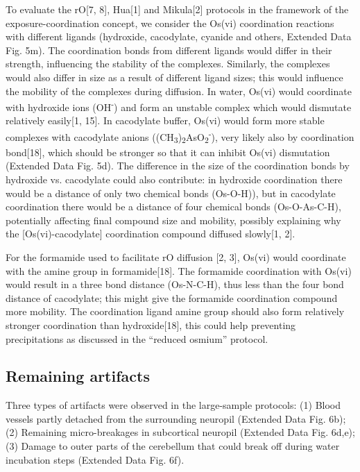 \documentclass{article}
\begin{document}
To evaluate the rO[7, 8], Hua[1] and Mikula[2] protocols in the framework of the exposure-coordination concept, we consider the Os(vi) coordination reactions with different ligands (hydroxide, cacodylate, cyanide and others, Extended Data Fig. 5m). The coordination bonds from different ligands would differ in their strength, influencing the stability of the complexes. Similarly, the complexes would also differ in size as a result of different ligand sizes; this would influence the mobility of the complexes during diffusion. In water, Os(vi) would coordinate with hydroxide ions (OH\textsuperscript{-}) and form an unstable complex which would dismutate relatively easily[1, 15]. In cacodylate buffer, Os(vi) would form more stable complexes with cacodylate anions ((CH\textsubscript{3})\textsubscript{2}AsO\textsubscript{2}\textsuperscript{-}), very likely also by coordination bond[18], which should be stronger so that it can inhibit Os(vi) dismutation (Extended Data Fig. 5d). The difference in the size of the coordination bonds by hydroxide vs. cacodylate could also contribute: in hydroxide coordination there would be a distance of only two chemical bonds (Os-O-H)), but in cacodylate coordination there would be a distance of four chemical bonds (Os-O-As-C-H), potentially affecting final compound size and mobility, possibly explaining why the [Os(vi)-cacodylate] coordination compound diffused slowly[1, 2].  

For the formamide used to facilitate rO diffusion [2, 3], Os(vi) would coordinate with the amine group in formamide[18]. The formamide coordination with Os(vi) would result in a three bond distance (Os-N-C-H), thus less than the four bond distance of cacodylate; this might give the formamide coordination compound more mobility. The coordination ligand amine group should also form relatively stronger coordination than hydroxide[18], this could help preventing precipitations as discussed in the “reduced osmium” protocol.  

\subsection*{Remaining artifacts}
 

Three types of artifacts were observed in the large-sample protocols: (1) Blood vessels partly detached from the surrounding neuropil (Extended Data Fig. 6b); (2) Remaining micro-breakages in subcortical neuropil (Extended Data Fig. 6d,e); (3) Damage to outer parts of the cerebellum that could break off during water incubation steps (Extended Data Fig. 6f).  
\end{document}
